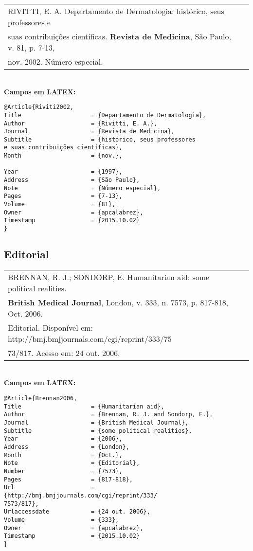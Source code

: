 \begin{tabular}{|l|c|} \hline
	RIVITTI, E. A. Departamento de Dermatologia: histórico, seus professores
	e \\ suas contribuições científicas. \textbf{Revista de Medicina}, São Paulo, v. 81, p. 7-13, \\ nov. 2002. Número especial.
	\\\hline
\end{tabular} \\

\textbf{Campos em LATEX:} 

\begin{verbatim}
@Article{Riviti2002,
Title                    = {Departamento de Dermatologia},
Author                   = {Rivitti, E. A.},
Journal                  = {Revista de Medicina},
Subtitle                 = {histórico, seus professores
e suas contribuições científicas},
Month                    = {nov.},

Year                     = {1997},
Address                  = {São Paulo},
Note                     = {Número especial},
Pages                    = {7-13},
Volume                   = {81},
Owner                    = {apcalabrez},
Timestamp                = {2015.10.02}
}
\end{verbatim}

\subsection{Editorial} 

\begin{tabular}{|l|c|} \hline
	BRENNAN, R. J.; SONDORP, E. Humanitarian aid: some political realities. \\ \textbf{British Medical Journal}, London, v. 333, n. 7573, p. 817-818, Oct. 2006. \\Editorial. Disponível em: http://bmj.bmjjournals.com/cgi/reprint/333/75\\73/817. Acesso em: 24 out. 2006. \\\hline
\end{tabular} \\

\textbf{Campos em LATEX:} 

\begin{verbatim}
@Article{Brennan2006,
Title                    = {Humanitarian aid},
Author                   = {Brennan, R. J. and Sondorp, E.},
Journal                  = {British Medical Journal},
Subtitle                 = {some political realities},
Year                     = {2006},
Address                  = {London},
Month                    = {Oct.},
Note                     = {Editorial},
Number                   = {7573},
Pages                    = {817-818},
Url                      = {http://bmj.bmjjournals.com/cgi/reprint/333/
7573/817},
Urlaccessdate            = {24 out. 2006},
Volume                   = {333},
Owner                    = {apcalabrez},
Timestamp                = {2015.10.02}
}
\end{verbatim}


